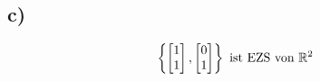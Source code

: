 \documentclass[a4paper, 11pt]{article}
\begin{document}
\subsection{c)}
\label{sec:org21afae1}
$$ \left\{ \begin{bmatrix} 1 \\ 1\end{bmatrix}, \begin{bmatrix} 0 \\ 1 \end{bmatrix} \right\} \text{ ist EZS von } \mathbb{R}^2 $$
\end{document}
